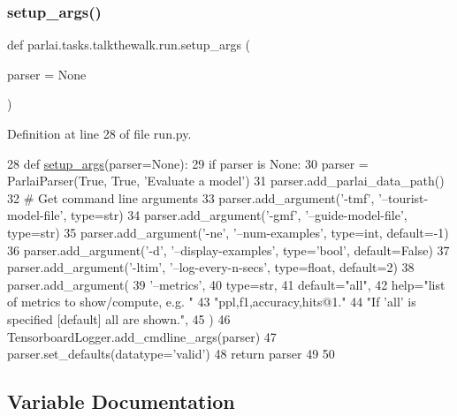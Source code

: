 \subsubsection{\texorpdfstring{setup\+\_\+args()}{setup\_args()}}
{\footnotesize\ttfamily def parlai.\+tasks.\+talkthewalk.\+run.\+setup\+\_\+args (\begin{DoxyParamCaption}\item[{}]{parser = {\ttfamily None} }\end{DoxyParamCaption})}



Definition at line 28 of file run.\+py.


\begin{DoxyCode}
28 \textcolor{keyword}{def }\hyperlink{namespaceparlai_1_1tasks_1_1talkthewalk_1_1run_a3534e8afa0a4dc25a6e02740fa35ac84}{setup\_args}(parser=None):
29     \textcolor{keywordflow}{if} parser \textcolor{keywordflow}{is} \textcolor{keywordtype}{None}:
30         parser = ParlaiParser(\textcolor{keyword}{True}, \textcolor{keyword}{True}, \textcolor{stringliteral}{'Evaluate a model'})
31     parser.add\_parlai\_data\_path()
32     \textcolor{comment}{# Get command line arguments}
33     parser.add\_argument(\textcolor{stringliteral}{'-tmf'}, \textcolor{stringliteral}{'--tourist-model-file'}, type=str)
34     parser.add\_argument(\textcolor{stringliteral}{'-gmf'}, \textcolor{stringliteral}{'--guide-model-file'}, type=str)
35     parser.add\_argument(\textcolor{stringliteral}{'-ne'}, \textcolor{stringliteral}{'--num-examples'}, type=int, default=-1)
36     parser.add\_argument(\textcolor{stringliteral}{'-d'}, \textcolor{stringliteral}{'--display-examples'}, type=\textcolor{stringliteral}{'bool'}, default=\textcolor{keyword}{False})
37     parser.add\_argument(\textcolor{stringliteral}{'-ltim'}, \textcolor{stringliteral}{'--log-every-n-secs'}, type=float, default=2)
38     parser.add\_argument(
39         \textcolor{stringliteral}{'--metrics'},
40         type=str,
41         default=\textcolor{stringliteral}{"all"},
42         help=\textcolor{stringliteral}{"list of metrics to show/compute, e.g. "}
43         \textcolor{stringliteral}{"ppl,f1,accuracy,hits@1."}
44         \textcolor{stringliteral}{"If 'all' is specified [default] all are shown."},
45     )
46     TensorboardLogger.add\_cmdline\_args(parser)
47     parser.set\_defaults(datatype=\textcolor{stringliteral}{'valid'})
48     \textcolor{keywordflow}{return} parser
49 
50 
\end{DoxyCode}


\subsection{Variable Documentation}
\mbox{\label{namespaceparlai_1_1tasks_1_1talkthewalk_1_1run_a6ddc3f1bb5ff1ce0a0b25bb1abfd2251}} 
